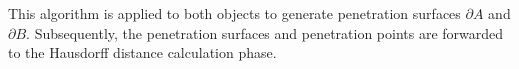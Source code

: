 This algorithm is applied to both objects to generate penetration surfaces $\partial A$ and $\partial B$.
Subsequently, the penetration surfaces and penetration points are forwarded to the Hausdorff distance calculation phase.











